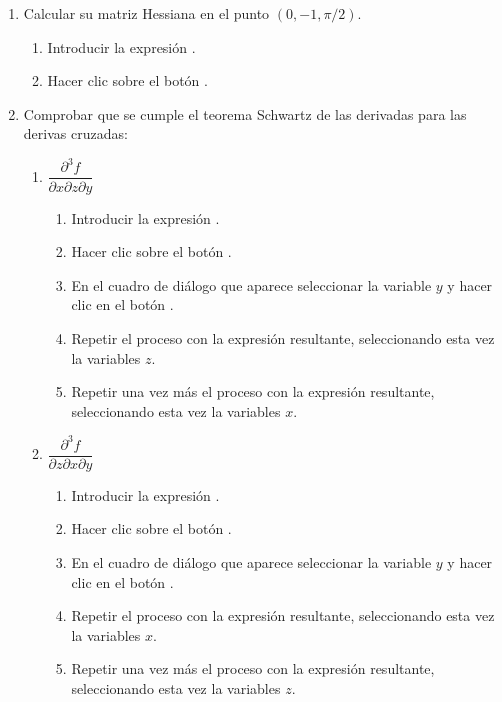 \begin{enumerate}[leftmargin=*]
\begin{enumerate}
\item Calcular su matriz Hessiana en el punto $(0,-1,\pi/2)$.
\begin{indicacion}
\begin{enumerate}
\item Introducir la expresión .
\item Hacer clic sobre el botón .
\end{enumerate}
\end{indicacion}

\item Comprobar que se cumple el teorema Schwartz de las derivadas para las derivas cruzadas:
\begin{enumerate}
\item $\dfrac{{\partial ^3 f}} {{\partial x\partial z\partial y}}$
\begin{indicacion}
\begin{enumerate}
\item Introducir la expresión .
\item Hacer clic sobre el botón .
\item En el cuadro de diálogo que aparece seleccionar la variable $y$ y hacer clic en el botón .
\item Repetir el proceso con la expresión resultante, seleccionando esta vez la variables $z$.
\item Repetir una vez más el proceso con la expresión resultante, seleccionando esta vez la variables $x$.
\end{enumerate}
\end{indicacion}

\item $\dfrac{{\partial ^3 f}} {{\partial z\partial x\partial y}}$
\begin{indicacion}
\begin{enumerate}
\item Introducir la expresión .
\item Hacer clic sobre el botón .
\item En el cuadro de diálogo que aparece seleccionar la variable $y$ y hacer clic en el botón .
\item Repetir el proceso con la expresión resultante, seleccionando esta vez la variables $x$.
\item Repetir una vez más el proceso con la expresión resultante, seleccionando esta vez la variables $z$.
\end{enumerate}
\end{indicacion}
\end{enumerate}


\end{enumerate}
\end{enumerate}
